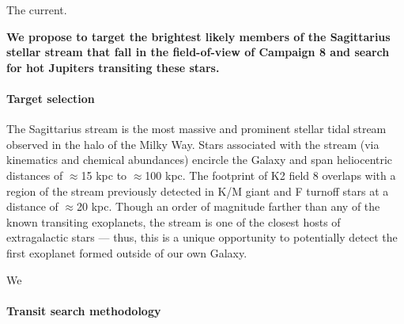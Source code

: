 \documentclass[letterpaper,12pt,preprint]{hack_aastex}
\begin{document}
The current.

{\bf We propose to target the brightest likely members of the Sagittarius
stellar stream that fall in the field-of-view of Campaign 8 and search for hot
Jupiters transiting these stars.}

\paragraph{Target selection}

The Sagittarius stream is the most massive and prominent stellar tidal stream observed in the halo of the Milky Way. Stars associated with the stream (via kinematics and chemical abundances) encircle the Galaxy and span heliocentric distances of $\approx$15 kpc to $\approx$100 kpc. The footprint of K2 field 8 overlaps with a region of the stream previously detected in K/M giant and F turnoff stars \citep{Majewski:2003, Yanny:2009} at a distance of $\approx$20 kpc. Though an order of magnitude farther than any of the known transiting exoplanets, the stream is one of the closest hosts of extragalactic stars --- thus, this is a unique opportunity to potentially detect the first exoplanet formed outside of our own Galaxy.

We 


\paragraph{Transit search methodology}
\end{document}

